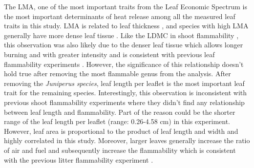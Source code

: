\documentclass[12pt]{report}
\begin{document}
The \uppercase{lma}, one of the most important traits from the Leaf Economic Spectrum \citep{wright2004worldwide} is the most important determinants of heat release among all the measured leaf traits in this study. \uppercase{lma} is related to leaf thickness \citep{niinemets1999research}, and species with high \uppercase{lma} generally have more dense leaf tissue \citep{poorter2009causes}. Like the \uppercase{ldmc} in shoot flammability \citep{alam2020shoot,potts2022growth}, this observation was also likely due to the denser leaf tissue which allows longer burning and with greater intensity and is consistent with previous leaf flammability experiments \citep{krix2018landscape}. However, the significance of this relationship doesn’t hold true after removing the most flammable genus from the analysis. After removing the \emph{Juniperus species}, leaf length per leaflet is the most important leaf trait for the remaining species. Interestingly, this observation is inconsistent with previous shoot flammability experiments \citep{alam2020shoot} where they didn’t find any relationship between leaf length and flammability. Part of the reason could be the shorter range of the leaf length per leaflet (range: 0.26-4.58 cm) in this experiment. However, leaf area is proportional to the product of leaf length and width \citep{shi2019leaf} and highly correlated in this study. Moreover, larger leaves generally increase the ratio of air and fuel and subsequently increase the flammability which is consistent with the previous litter flammability experiment \citep{scarff2006leaf,kane2008burning,de2012leaf}. 
\end{document}
